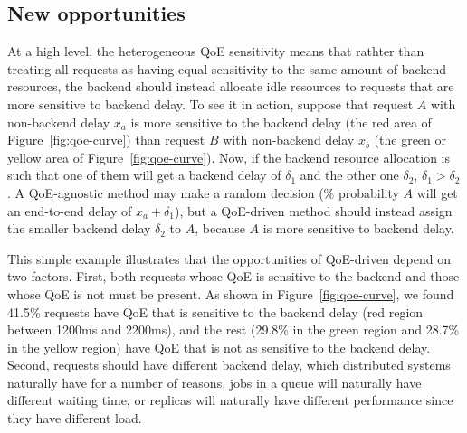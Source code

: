 \subsection{New opportunities}
At a high level, the heterogeneous QoE sensitivity means that rathter than treating all requests as having equal sensitivity to the same amount of backend resources, the backend should instead allocate idle resources to requests that are more sensitive to backend delay.
To see it in action, suppose that request $A$ with non-backend delay $x_a$ is more sensitive to the backend delay (the red area of Figure~\ref{fig:qoe-curve}) than request $B$ with non-backend delay $x_b$ (the green or yellow area of Figure~\ref{fig:qoe-curve}). Now, if the backend resource allocation is such that one of them will get a backend delay of $\delta_1$ and the other one $\delta_2$, $\delta_1>\delta_2$. A QoE-agnostic method may make a random decision (\% probability $A$ will get an end-to-end delay of $x_a+\delta_1$), but a QoE-driven method should instead assign the smaller backend delay $\delta_2$ to $A$, because $A$ is more sensitive to backend delay.

This simple example illustrates that the opportunities of QoE-driven depend on two factors.
First, both requests whose QoE is sensitive to the backend and those whose QoE is not must be present. As shown in Figure~\ref{fig:qoe-curve}, we found 41.5\% requests have QoE that is sensitive to the backend delay (red region between 1200ms and 2200ms), and the rest (29.8\% in the green region and 28.7\% in the yellow region) have QoE that is not as sensitive to the backend delay.
Second, requests should have different backend delay, which distributed systems naturally have for a number of reasons, \eg jobs in a queue will naturally have different waiting time, or replicas will naturally have different performance since they have different load.


